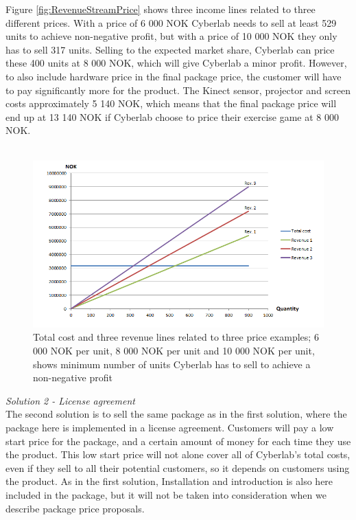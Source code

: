 Figure \ref{fig:RevenueStreamPrice} shows three income lines related to three different prices. With a price of 6 000 NOK Cyberlab needs to sell at least 529 units to achieve non-negative profit, but with a price of 10 000 NOK they only has to sell 317 units. Selling to the expected market share, Cyberlab can price these 400 units at 8 000 NOK, which will give Cyberlab a minor profit. However, to also include hardware price in the final package price, the customer will have to pay significantly more for the product. The Kinect sensor, projector and screen costs approximately 5 140 NOK, which means  that the final package price will end up at 13 140 NOK if Cyberlab choose to price their exercise game at 8 000 NOK.\\ \\
\begin{figure}
\label{fig:RevenueStreamQuantity}
\begin{center}
\includegraphics[scale=0.7]{revenuestreamquantity}
\caption[Quantity examples]{Total cost and three revenue lines related to three price examples; 6 000 NOK per unit, 8 000 NOK per unit and 10 000 NOK per unit, shows minimum number of units Cyberlab has to sell to achieve a non-negative profit}
\end{center}
\end{figure}
\emph{Solution 2 - License agreement}\\
The second solution is to sell the same package as in the first solution, where the package here is implemented in a license agreement. Customers will pay a low start price for the package, and a certain amount of money for each time they use the product. This low start price will not alone cover all of Cyberlab’s total costs, even if they sell to all their potential customers, so it depends on customers using the product. As in the first solution, Installation and introduction is also here included in the package, but it will not be taken into consideration when we describe package price proposals. \\ \\
